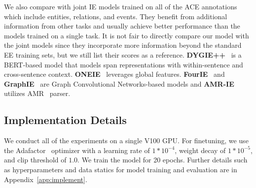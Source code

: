 We also compare with joint IE models trained on all of the ACE annotations which include entities, relations, and events. They benefit from additional information from other tasks and usually achieve better performance than the models trained on a single task. 
It is not fair to directly compare our model with the joint models since they incorporate more information beyond the standard EE training sets, but we still list their scores as a reference. \textbf{DYGIE++}~\cite{wadden2019entity} is a BERT-based model that models span representations with within-sentence and cross-sentence context. \textbf{ONEIE}~\cite{lin2020joint} leverages global features. \textbf{FourIE}~\cite{van2021cross} and \textbf{GraphIE}~\cite{van2022joint} are Graph Convolutional Networks-based models and \textbf{AMR-IE}~\cite{zhang2021abstract} utilizes AMR~\cite{banarescu2013abstract} parser.

\subsection{Implementation Details}
We conduct all of the experiments on a single V100 GPU. For finetuning, we use the Adafactor~\cite{shazeer2018adafactor} optimizer with a learning rate of $1*10^{-4}$, weight decay of $1 * 10^{-5}$,  and clip threshold of $1.0$. We train the model for 20 epochs. Further details such as hyperparameters and data statics for model training and evaluation are in Appendix~\ref{app:implement}.

        

        
    

         

        

        
   
 

 

\label{sec:results}
